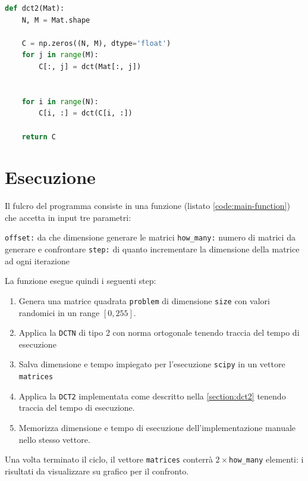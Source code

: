 \documentclass[11pt,italian]{article}
\makeatletter
\newcommand*{\lstitem}[1][]{%
  \setbox0\hbox\bgroup
    \patchcmd{\lst@InlineM}{\@empty}{\@empty\egroup\item[\usebox0]\leavevmode\ignorespaces}{}{}%
    \lstinline[#1]%
}
\makeatother
\begin{document}
\begin{lstlisting}[language=python,emph={math,np},caption=Implementazione della DCT multidimensionale (DCT2)]
def dct2(Mat):
    N, M = Mat.shape

    C = np.zeros((N, M), dtype='float')
    for j in range(M):
        C[:, j] = dct(Mat[:, j])


    for i in range(N):
        C[i, :] = dct(C[i, :])

    return C
\end{lstlisting}

\newpage
\section{Esecuzione}
Il fulcro del programma consiste in una funzione (listato \ref{code:main-function}) che accetta in input tre parametri:
\begin{description}
    \lstitem{offset:} da che dimensione generare le matrici
    \lstitem{how_many:} numero di matrici da generare e confrontare
    \lstitem{step:} di quanto incrementare la dimensione della matrice ad ogni iterazione
\end{description}

\noindent
La funzione esegue quindi i seguenti step:
\begin{enumerate}
    \item Genera una matrice quadrata \lstinline{problem} di dimensione \lstinline{size} con valori randomici in un range $[0,255]$.
    \item Applica la \lstinline{DCTN} di tipo 2 con norma ortogonale tenendo traccia del tempo di esecuzione
    \item Salva dimensione e tempo impiegato per l'esecuzione \lstinline{scipy} in un vettore \lstinline{matrices}
    \item Applica la \lstinline{DCT2} implementata come descritto nella \cref{section:dct2} tenendo traccia del tempo di esecuzione.
    \item Memorizza dimensione e tempo di esecuzione dell'implementazione manuale nello stesso vettore.
\end{enumerate}
\noindent
Una volta terminato il ciclo, il vettore \lstinline{matrices} conterrà $2\times$\lstinline{how_many} elementi: i risultati da visualizzare su grafico per il confronto.
\end{document}
